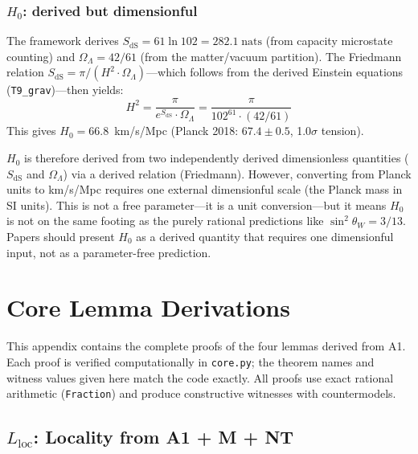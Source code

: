 \documentclass[11pt]{article}
\newcommand{\nats}{\;\mathrm{nats}}
\begin{document}
\subsubsection{\texorpdfstring{$H_0$}{H0}: derived but dimensionful}

The framework derives $S_{\mathrm{dS}} = 61\ln 102 = 282.1\nats$ (from capacity microstate counting) and $\Omega_\Lambda = 42/61$ (from the matter/vacuum partition).  The Friedmann relation $S_{\mathrm{dS}} = \pi/(H^2 \cdot \Omega_\Lambda)$---which follows from the derived Einstein equations (\texttt{T9\_grav})---then yields:
\begin{equation}
H^2 = \frac{\pi}{e^{S_{\mathrm{dS}}} \cdot \Omega_\Lambda} = \frac{\pi}{102^{61} \cdot (42/61)}
\end{equation}
This gives $H_0 = 66.8$~km/s/Mpc (Planck 2018: $67.4 \pm 0.5$, 1.0$\sigma$ tension).

$H_0$ is therefore derived from two independently derived dimensionless quantities ($S_{\mathrm{dS}}$ and $\Omega_\Lambda$) via a derived relation (Friedmann).  However, converting from Planck units to km/s/Mpc requires one external dimensionful scale (the Planck mass in SI units).  This is not a free parameter---it is a unit conversion---but it means $H_0$ is not on the same footing as the purely rational predictions like $\sin^2\!\theta_W = 3/13$.  Papers should present $H_0$ as a derived quantity that requires one dimensionful input, not as a parameter-free prediction.


\newpage
\appendix

\section{Core Lemma Derivations}

This appendix contains the complete proofs of the four lemmas derived from A1.  Each proof is verified computationally in \texttt{core.py}; the theorem names and witness values given here match the code exactly.  All proofs use exact rational arithmetic (\texttt{Fraction}) and produce constructive witnesses with countermodels.

\subsection{\texorpdfstring{$L_{\mathrm{loc}}$}{Lloc}: Locality from A1 + M + NT}
\end{document}
